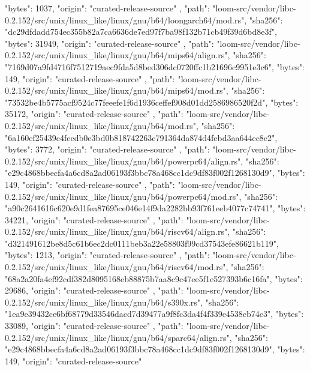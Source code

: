 {{      "bytes": 1037,
      "origin": "curated-release-source"
    },
    {
      "path": "loom-src/vendor/libc-0.2.152/src/unix/linux_like/linux/gnu/b64/loongarch64/mod.rs",
      "sha256": "dc29dfdadd754ec355b82a7ca6636de7ed97f7ba98f132b71cb49f39d6bd8e3f",
      "bytes": 31949,
      "origin": "curated-release-source"
    },
    {
      "path": "loom-src/vendor/libc-0.2.152/src/unix/linux_like/linux/gnu/b64/mips64/align.rs",
      "sha256": "7169d07a9fd4716f7512719aec9fda5d8bed306dc0720ffc1b21696c9951e3c6",
      "bytes": 149,
      "origin": "curated-release-source"
    },
    {
      "path": "loom-src/vendor/libc-0.2.152/src/unix/linux_like/linux/gnu/b64/mips64/mod.rs",
      "sha256": "73532be4b5775acf9524c77feeefe1f6d1936ceffef908d01dd2586986520f2d",
      "bytes": 35172,
      "origin": "curated-release-source"
    },
    {
      "path": "loom-src/vendor/libc-0.2.152/src/unix/linux_like/linux/gnu/b64/mod.rs",
      "sha256": "6a160ef25439c4fecdb0e3bd0b818742263c791364da874d4febd3aa644ec8e2",
      "bytes": 3772,
      "origin": "curated-release-source"
    },
    {
      "path": "loom-src/vendor/libc-0.2.152/src/unix/linux_like/linux/gnu/b64/powerpc64/align.rs",
      "sha256": "e29c4868bbecfa4a6cd8a2ad06193f3bbc78a468cc1dc9df83f002f1268130d9",
      "bytes": 149,
      "origin": "curated-release-source"
    },
    {
      "path": "loom-src/vendor/libc-0.2.152/src/unix/linux_like/linux/gnu/b64/powerpc64/mod.rs",
      "sha256": "a90c2641616c620e9d1fea87695ce046e14f9da2282bb93f761eeb4077c74741",
      "bytes": 34221,
      "origin": "curated-release-source"
    },
    {
      "path": "loom-src/vendor/libc-0.2.152/src/unix/linux_like/linux/gnu/b64/riscv64/align.rs",
      "sha256": "d321491612be8d5c61b6ec2dc0111beb3a22e58803f99cd37543efe86621b119",
      "bytes": 1213,
      "origin": "curated-release-source"
    },
    {
      "path": "loom-src/vendor/libc-0.2.152/src/unix/linux_like/linux/gnu/b64/riscv64/mod.rs",
      "sha256": "68a2a20fa4ef92cdf382d8095168eb88875b7aa8c9c47ee5f1e527393b6c16fa",
      "bytes": 29686,
      "origin": "curated-release-source"
    },
    {
      "path": "loom-src/vendor/libc-0.2.152/src/unix/linux_like/linux/gnu/b64/s390x.rs",
      "sha256": "1ea9e39432ce6bf68779d33546dacd7d39477a9f8fc3da4f4f339e4538cb74c3",
      "bytes": 33089,
      "origin": "curated-release-source"
    },
    {
      "path": "loom-src/vendor/libc-0.2.152/src/unix/linux_like/linux/gnu/b64/sparc64/align.rs",
      "sha256": "e29c4868bbecfa4a6cd8a2ad06193f3bbc78a468cc1dc9df83f002f1268130d9",
      "bytes": 149,
      "origin": "curated-release-source"
}}

